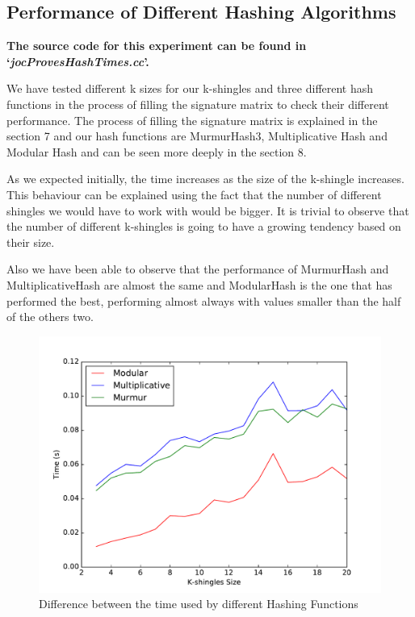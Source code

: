 \documentclass[12pt]{article}
\begin{document}
\subsection{Performance of Different Hashing Algorithms}
\textbf{The source code for this experiment can be found in `\textit{jocProvesHashTimes.cc}'.}
\bigskip

We have tested different k sizes for our k-shingles and three different hash functions in the process of filling the signature matrix to check their different performance. The process of filling the signature matrix is explained in the section 7 and our hash functions are MurmurHash3, Multiplicative Hash and Modular Hash and can be seen more deeply in the section 8.

As we expected initially, the time increases as the size of the k-shingle increases. This behaviour can be explained using the fact that the number of different shingles we would have to work with would be bigger. It is trivial to observe that the number of different k-shingles is going to have a growing tendency based on their size. 

Also we have been able to observe that the performance of MurmurHash and MultiplicativeHash are almost the same and ModularHash is the one that has performed the best, performing almost always with values smaller than the half of the others two.



\begin{figure}[H]
	\centering
	\includegraphics[scale=0.55]{graphs/HashFunctionsJaccardAproxTime.pdf} 
	\caption{Difference between the time used by different Hashing Functions}
	\label{fig:HhashFunctionsTime}
\end{figure}
\end{document}
